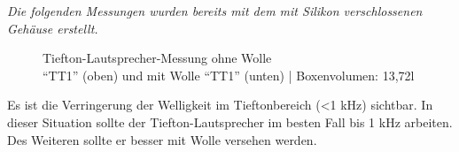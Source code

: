 \newpage
\textit{Die folgenden Messungen wurden bereits mit dem mit Silikon verschlossenen Gehäuse erstellt.}\\
\begin{figure} [H]
	\centering
	\quad
	\caption{Tiefton-Lautsprecher-Messung ohne Wolle\\ \enquote{TT1} (oben) und mit Wolle \enquote{TT1} (unten) | Boxenvolumen: 13,72l}
	\label{fig:4.2.4.1}
\end{figure}
Es ist die Verringerung der Welligkeit im Tieftonbereich (<1 kHz) sichtbar.
In dieser Situation sollte der Tiefton-Lautsprecher im besten Fall bis 1 kHz arbeiten.
Des Weiteren sollte er besser mit Wolle versehen werden.

